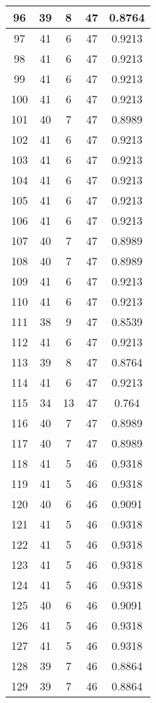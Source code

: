 \documentclass[letterpaper, 12pt]{article}
\begin{document}
\begin{longtable}{|c|c|c|c|c|}
\hline
96 & 39 & 8 & 47 & 0.8764 \\
\hline
97 & 41 & 6 & 47 & 0.9213 \\
\hline
98 & 41 & 6 & 47 & 0.9213 \\
\hline
99 & 41 & 6 & 47 & 0.9213 \\
\hline
100 & 41 & 6 & 47 & 0.9213 \\
\hline
101 & 40 & 7 & 47 & 0.8989 \\
\hline
102 & 41 & 6 & 47 & 0.9213 \\
\hline
103 & 41 & 6 & 47 & 0.9213 \\
\hline
104 & 41 & 6 & 47 & 0.9213 \\
\hline
105 & 41 & 6 & 47 & 0.9213 \\
\hline
106 & 41 & 6 & 47 & 0.9213 \\
\hline
107 & 40 & 7 & 47 & 0.8989 \\
\hline
108 & 40 & 7 & 47 & 0.8989 \\
\hline
109 & 41 & 6 & 47 & 0.9213 \\
\hline
110 & 41 & 6 & 47 & 0.9213 \\
\hline
111 & 38 & 9 & 47 & 0.8539 \\
\hline
112 & 41 & 6 & 47 & 0.9213 \\
\hline
113 & 39 & 8 & 47 & 0.8764 \\
\hline
114 & 41 & 6 & 47 & 0.9213 \\
\hline
115 & 34 & 13 & 47 & 0.764 \\
\hline
116 & 40 & 7 & 47 & 0.8989 \\
\hline
117 & 40 & 7 & 47 & 0.8989 \\
\hline
118 & 41 & 5 & 46 & 0.9318 \\
\hline
119 & 41 & 5 & 46 & 0.9318 \\
\hline
120 & 40 & 6 & 46 & 0.9091 \\
\hline
121 & 41 & 5 & 46 & 0.9318 \\
\hline
122 & 41 & 5 & 46 & 0.9318 \\
\hline
123 & 41 & 5 & 46 & 0.9318 \\
\hline
124 & 41 & 5 & 46 & 0.9318 \\
\hline
125 & 40 & 6 & 46 & 0.9091 \\
\hline
126 & 41 & 5 & 46 & 0.9318 \\
\hline
127 & 41 & 5 & 46 & 0.9318 \\
\hline
128 & 39 & 7 & 46 & 0.8864 \\
\hline
129 & 39 & 7 & 46 & 0.8864 \\

\end{longtable}
\end{document}
